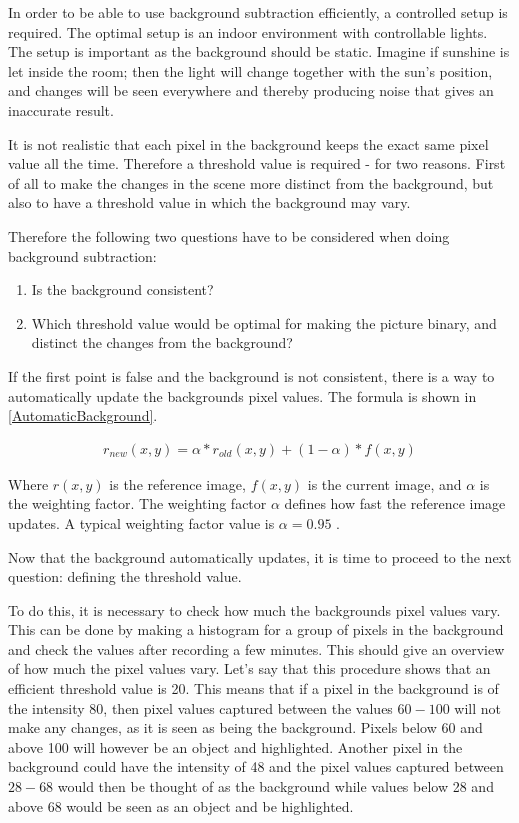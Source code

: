 {In order to be able to use background subtraction efficiently, a controlled setup is required. The optimal setup is an indoor environment with controllable lights. The setup is important as the background should be static. Imagine if sunshine is let inside the room; then the light will change together with the sun's position, and changes will be seen everywhere and thereby producing noise that gives an inaccurate result.

It is not realistic that each pixel in the background keeps the exact same pixel value all the time. Therefore a threshold value is required - for two reasons. First of all to make the changes in the scene more distinct from the background, but also to have a threshold value in which the background may vary.

Therefore the following two questions have to be considered when doing background subtraction:
\begin{enumerate} 
	\item Is the background consistent? 
	\item Which threshold value would be optimal for making the picture binary, and distinct the changes from the background? 
\end{enumerate}

If the first point is false and the background is not consistent, there is a way to automatically update the backgrounds pixel values. The formula is shown in \ref{AutomaticBackground}.

\begin{equation}
	\begin{aligned}
  		r_{new}(x,y)=\alpha*r_{old}(x,y)+(1-\alpha)*f(x,y)
		\label{AutomaticBackground}  
 	\end{aligned}
\end{equation}  

Where $r(x,y)$ is the reference image, $f(x,y)$ is the current image, and $\alpha$ is the weighting factor. The weighting factor $\alpha$ defines how fast the reference image updates. A typical weighting factor value is  $\alpha = 0.95$ \citep{ip_book}.

Now that the background automatically updates, it is time to proceed to the next question: defining the threshold value.

To do this, it is necessary to check how much the backgrounds pixel values vary. This can be done by making a histogram for a group of pixels in the background and check the values after recording a few minutes. This should give an overview of how much the pixel values vary. Let's say that this procedure shows that an efficient threshold value is 20. This means that if a pixel in the background is of the intensity 80, then pixel values captured between the values $60-100$ will not make any changes, as it is seen as being the background. Pixels below 60 and above 100 will however be an object and highlighted. Another pixel in the background could have the intensity of 48 and the pixel values captured between $28-68$ would then be thought of as the background while values below 28 and above 68 would be seen as an object and be highlighted.

}
